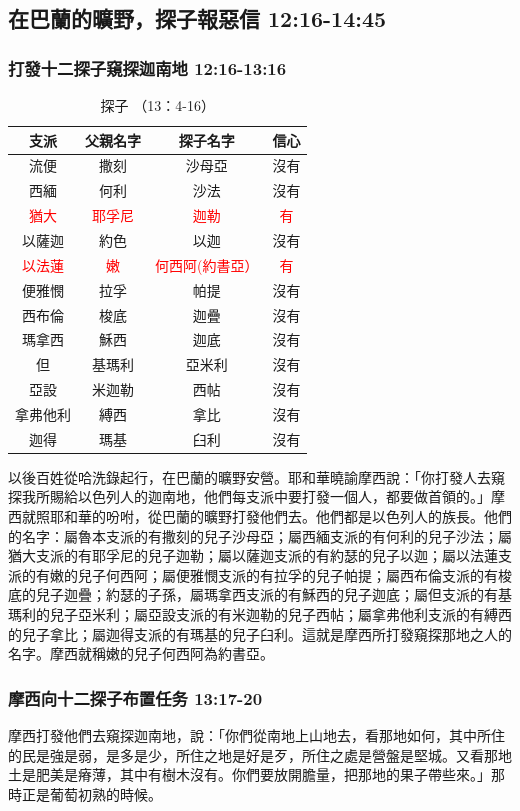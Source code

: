 \subsection{在巴蘭的曠野，探子報惡信 12:16-14:45}
\subsubsection{打發十二探子窺探迦南地 12:16-13:16}
\begin{table}
\vspace*{-10mm}
\centering
\begin{tabular}{|c|c|c|c|}
\hline
\hline
支派 & 父親名字&探子名字&  信心 \\ \hline\hline
流便 &撒刻 & 沙母亞 &沒有\\ \hline
西緬 &何利 & 沙法 & 沒有\\ \hline
\textcolor{red}{猶大} & \textcolor{red}{耶孚尼} &\textcolor{red}{迦勒}&\textcolor{red}有\\\hline
以薩迦& 約色&以迦&沒有\\\hline
\textcolor{red}{以法蓮}& \textcolor{red}嫩&\textcolor{red}{何西阿(約書亞）}&\textcolor{red}有\\\hline
便雅憫&拉孚&帕提&沒有 \\\hline
西布倫&梭底&迦疊&沒有\\\hline
瑪拿西&穌西&迦底&沒有\\\hline
但&基瑪利&亞米利&沒有\\\hline
亞設&米迦勒&西帖&沒有\\\hline
拿弗他利&縛西&拿比&沒有\\\hline
迦得&瑪基&臼利&沒有\\\hline\hline
\end{tabular}
\caption{探子 （13：4-16）}
\end{table}
以後百姓從哈洗錄起行，在巴蘭的曠野安營。耶和華曉諭摩西說：「你打發人去窺探我所賜給以色列人的迦南地，他們每支派中要打發一個人，都要做首領的。」摩西就照耶和華的吩咐，從巴蘭的曠野打發他們去。他們都是以色列人的族長。他們的名字：屬魯本支派的有撒刻的兒子沙母亞；屬西緬支派的有何利的兒子沙法；屬猶大支派的有耶孚尼的兒子迦勒；屬以薩迦支派的有約瑟的兒子以迦；屬以法蓮支派的有嫩的兒子何西阿；屬便雅憫支派的有拉孚的兒子帕提；屬西布倫支派的有梭底的兒子迦疊；約瑟的子孫，屬瑪拿西支派的有穌西的兒子迦底；屬但支派的有基瑪利的兒子亞米利；屬亞設支派的有米迦勒的兒子西帖；屬拿弗他利支派的有縛西的兒子拿比；屬迦得支派的有瑪基的兒子臼利。這就是摩西所打發窺探那地之人的名字。摩西就稱嫩的兒子何西阿為約書亞。

\subsubsection{摩西向十二探子布置任务 13:17-20}
摩西打發他們去窺探迦南地，說：「你們從南地上山地去，看那地如何，其中所住的民是強是弱，是多是少，所住之地是好是歹，所住之處是營盤是堅城。又看那地土是肥美是瘠薄，其中有樹木沒有。你們要放開膽量，把那地的果子帶些來。」那時正是葡萄初熟的時候。

